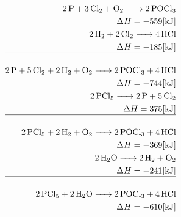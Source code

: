 \documentclass[12pt]{article}
\begin{document}
\begin{enumerate}
    \begin{equation}
      \begin{split}
        \ce{2P + 3Cl2 + O2 -> 2POCl3}\\
        \Delta H=-559[\si{\kilo\joule}]\\
        \ce{2H2 + 2Cl2 -> 4HCl}\\
        \Delta H=-185[\si{\kilo\joule}]\\
        \hline\\
        \ce{2P + 5Cl2 + 2H2 + O2 -> 2POCl3 + 4HCl}\\
        \Delta H=-744[\si{\kilo\joule}]\\
        \ce{2PCl5 -> 2P + 5Cl2}\\
        \Delta H=375[\si{\kilo\joule}]\\
        \hline\\
        \ce{2PCl5 + 2H2 + O2 -> 2POCl3 + 4HCl}\\
        \Delta H=-369[\si{\kilo\joule}]\\
        \ce{2H2O -> 2H2 + O2}\\
        \Delta H=-241[\si{\kilo\joule}]\\
        \hline\\
        \ce{2PCl5 + 2H2O -> 2POCl3 + 4HCl}\\
        \Delta H=-610[\si{\kilo\joule}]\\
      \end{split}
      \label{5}
    \end{equation}

\end{enumerate}
\end{document}
